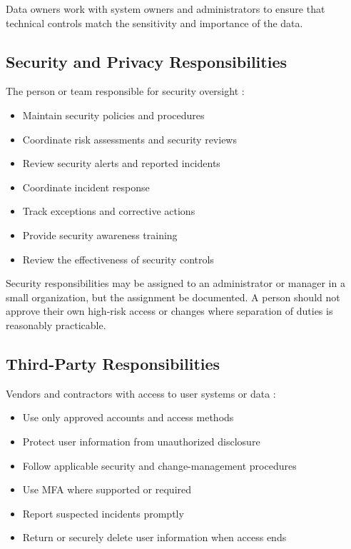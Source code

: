 Data owners \should{} work with system owners and administrators to ensure that technical controls match the sensitivity and importance of the data.

\subsection{Security and Privacy Responsibilities}

The person or team responsible for security oversight \should{}:

\begin{itemize}
    \item Maintain security policies and procedures
    \item Coordinate risk assessments and security reviews
    \item Review security alerts and reported incidents
    \item Coordinate incident response
    \item Track exceptions and corrective actions
    \item Provide security awareness training
    \item Review the effectiveness of security controls
\end{itemize}

Security responsibilities may be assigned to an administrator or manager in a small organization, but the assignment \must{} be documented.
A person should not approve their own high-risk access or changes where separation of duties is reasonably practicable.

\subsection{Third-Party Responsibilities}

Vendors and contractors with access to user systems or data \must{}:
\begin{itemize}
    \item Use only approved accounts and access methods
    \item Protect user information from unauthorized disclosure
    \item Follow applicable security and change-management procedures
    \item Use MFA where supported or required
    \item Report suspected incidents promptly
    \item Return or securely delete user information when access ends
\end{itemize}

